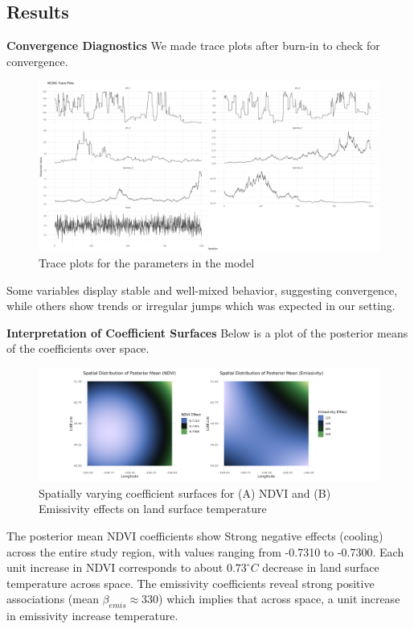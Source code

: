\subsection{Results}
\textbf{Convergence Diagnostics}\newline
We made trace plots after burn-in to check for convergence. 

\begin{figure}[ht]
 \centering
 \includegraphics[width=\textwidth]{../../figures/traceplots.png}
 \caption{Trace plots for the parameters in the model}
 \label{fig:traceplots}
 \end{figure}
Some variables display stable and well-mixed behavior, suggesting convergence, while others show trends or irregular jumps which was expected in our setting.

\textbf{Interpretation of Coefficient Surfaces} \newline
Below is a plot of the posterior means of the coefficients over space.

\begin{figure}[ht]
 \centering
 \includegraphics[width=\textwidth]{../../figures/model_means.png}
 \caption{Spatially varying coefficient surfaces for (A) NDVI and (B) Emissivity effects on land surface temperature}
 \label{fig:posterior means}
 \end{figure}
 The posterior mean NDVI coefficients show Strong negative effects (cooling) across the entire study region, with values ranging from -0.7310 to -0.7300. 
 Each unit increase in NDVI corresponds to about $0.73^\circ C$ decrease in land surface temperature across space.
 The emissivity coefficients reveal strong positive associations (mean $\beta_{emis} \approx 330$) which implies that across space, a unit increase in emissivity increase temperature.\newline
 
